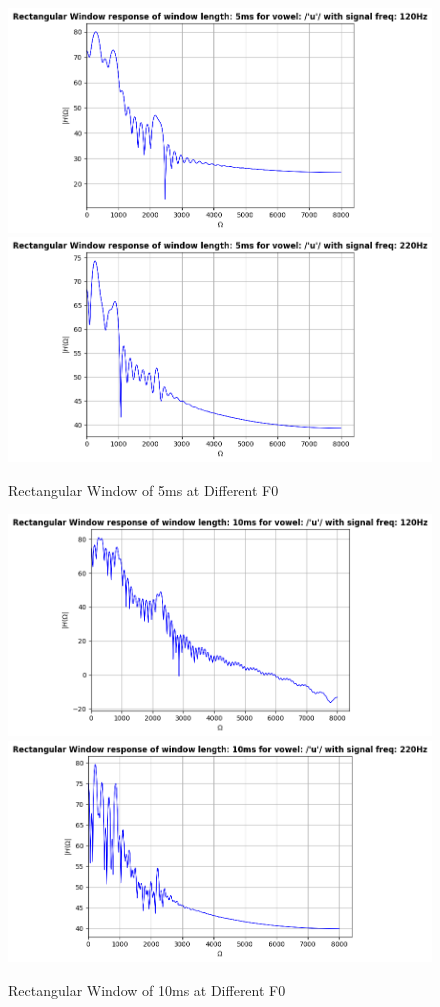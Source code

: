 \documentclass{article}
\begin{document}
\begin{figure}[H]
\centering
\includegraphics[scale = 0.5]{rect_5_120.png}\hfill
\includegraphics[scale = 0.5]{rect_5_220.png}
\caption{Rectangular Window of 5ms at Different F0}
\end{figure}

\begin{figure}[H]
\centering
\includegraphics[scale = 0.5]{rect_10_120.png}\hfill
\includegraphics[scale = 0.5]{rect_10_220.png}
\caption{Rectangular Window of 10ms at Different F0}
\end{figure}
\newpage
\end{document}
